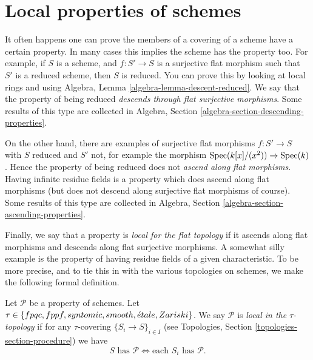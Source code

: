 \section{Local properties of schemes}
\label{section-descending-properties}

\noindent
It often happens one can prove the members of a covering of a scheme
have a certain property. In many cases this implies the scheme has the
property too. For example, if $S$ is a scheme, and $f : S' \to S$
is a surjective flat morphism such that $S'$ is a reduced scheme, then $S$ is
reduced. You can prove this by looking at local rings and using
Algebra, Lemma \ref{algebra-lemma-descent-reduced}.
We say that the property of being reduced
{\it descends through flat surjective morphisms}.
Some results of this type are collected in
Algebra, Section \ref{algebra-section-descending-properties}.

\medskip\noindent
On the other hand, there are examples of surjective flat morphisms
$f : S' \to S$ with $S$ reduced and $S'$ not, for example the morphism
$\mathop{\rm Spec}(k[x]/(x^2)) \to \mathop{\rm Spec}(k)$. Hence the property of
being reduced does not {\it ascend along flat morphisms}. Having infinite
residue fields is a property which does ascend along flat morphisms (but
does not descend along surjective flat morphisms of course). Some results
of this type are collected in
Algebra, Section \ref{algebra-section-ascending-properties}.

\medskip\noindent
Finally, we say that a property is {\it local for the flat topology}
if it ascends along flat morphisms and descends along flat surjective
morphisms. A somewhat silly example is the property of having residue
fields of a given characteristic. To be more precise, and to tie this in
with the various topologies on schemes, we make the following
formal definition.

\begin{definition}
\label{definition-property-local}
Let $\mathcal{P}$ be a property of schemes. Let
$\tau \in \{fpqc,\linebreak[0] fppf,\linebreak[0] syntomic,\linebreak[0]
smooth,\linebreak[0] \acute{e}tale,\linebreak[0] Zariski\}$.
We say $\mathcal{P}$ is {\it local in the $\tau$-topology} if for any
$\tau$-covering $\{S_i \to S\}_{i \in I}$ (see
Topologies, Section \ref{topologies-section-procedure})
we have
$$
S \text{ has }\mathcal{P}
\Leftrightarrow
\text{each }S_i \text{ has }\mathcal{P}.
$$
\end{definition}


